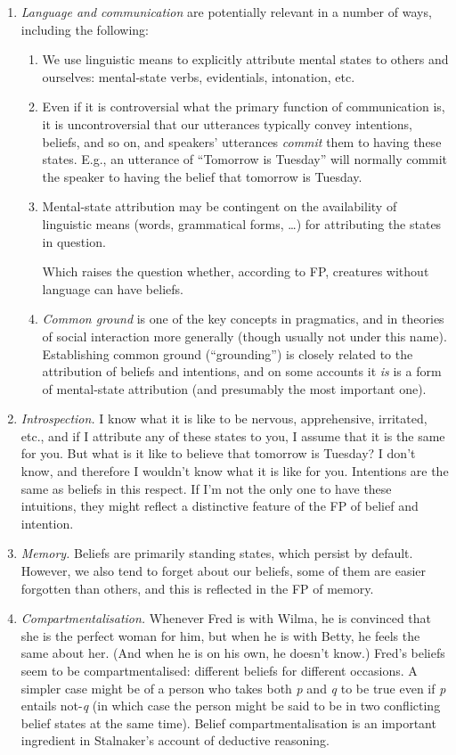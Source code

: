 \documentclass[12pt]{article}
\newcommand{\E}[1]{\emph{#1}}
\newcommand{\Q}[1]{``#1''}
\begin{document}
\begin{enumerate}
\item \E{Language and communication} are potentially relevant in a number of ways, including the following:
\begin{enumerate}\itemsep=0ex
\item We use linguistic means to explicitly attribute mental states to others and ourselves: mental-state verbs, evidentials, intonation, etc.
\item Even if it is controversial what the primary function of communication is, it is uncontroversial that our utterances typically convey intentions, beliefs, and so on, and speakers' utterances \E{commit} them to having these states. E.g., an utterance of \Q{Tomorrow is Tuesday} will normally commit the speaker to having the belief that tomorrow is Tuesday.
\item Mental-state attribution may be contingent on the availability of linguistic means (words, grammatical forms, \ldots) for attributing the states in question.
\par Which raises the question whether, according to FP, creatures without language can have beliefs.
\item \E{Common ground} is one of the key concepts in pragmatics, and in theories of social interaction more generally (though usually not under this name). Establishing common ground (\Q{grounding}) is closely related to the attribution of beliefs and intentions, and on some accounts it \E{is} is a form of mental-state attribution (and presumably the most important one).
\end{enumerate}

\item \E{Introspection.} I know what it is like to be nervous, apprehensive, irritated, etc., and if I attribute any of these states to you, I assume that it is the same for you. But what is it like to believe that tomorrow is Tuesday? I don't know, and therefore I wouldn't know what it is like for you. Intentions are the same as beliefs in this respect. If I'm not the only one to have these intuitions, they might reflect a distinctive feature of the FP of belief and intention.

\item \E{Memory.} Beliefs are primarily standing states, which persist by default. However, we also tend to forget about our beliefs, some of them are easier forgotten than others, and this is reflected in the FP of memory. 

\item \E{Compartmentalisation.}  Whenever Fred is with Wilma, he is convinced that she is the perfect woman for him, but when he is with Betty, he feels the same about her. (And when he is on his own, he doesn't know.) Fred's beliefs seem to be compartmentalised: different beliefs for different occasions. A simpler case might be of a person who takes both \E{p} and \E{q} to be true even if \E{p} entails not-\E{q} (in which case the person might be said to be in two conflicting belief states at the same time). Belief compartmentalisation is an important ingredient in Stalnaker's account of deductive reasoning.

\end{enumerate}
%
\end{document}
